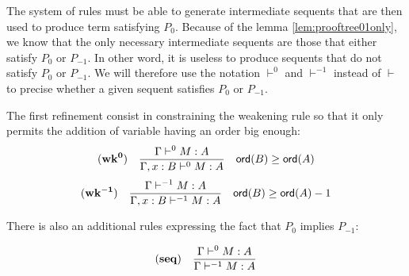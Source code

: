 The system of rules must be able to generate intermediate sequents that are then used to produce term
satisfying $P_0$. Because of the lemma \ref{lem:prooftree01only}, we know that the only necessary intermediate sequents
are those that either satisfy $P_0$ or $P_{-1}$. In other word, it is useless to produce sequents that do not satisfy
$P_0$ or $P_{-1}$. We will therefore use the notation $\vdash^0$ and $\vdash^{-1}$ instead of $\vdash$ to precise
whether a given sequent satisfies $P_0$ or $P_{-1}$.

The first refinement consist in constraining the weakening rule so that
it only permits the addition of variable having an order big enough:
$$ \mathbf{(wk^{0})} \quad  \frac{\displaystyle \Gamma \vdash^{0} M : A}{\Gamma , x : B \vdash^{0} M : A} \quad {\sf ord}(B) \geq {\sf ord}(A) $$
$$ \mathbf{(wk^{-1})} \quad  \frac{\displaystyle \Gamma \vdash^{-1} M : A}{\Gamma , x : B \vdash^{-1} M : A} \quad {\sf ord}(B) \geq {\sf ord}(A) -1$$

There is also an additional rules expressing the fact that $P_0$ implies $P_{-1}$:

$$ \mathbf{(seq)} \quad \frac{\displaystyle \Gamma \vdash^{0} M : A}{\Gamma \vdash^{-1} M : A} $$


